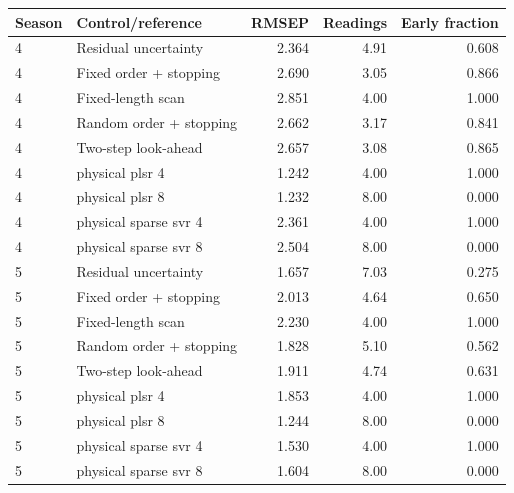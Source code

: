 \begin{tabular}{llrrr}
\toprule
Season & Control/reference & RMSEP & Readings & Early fraction \\
\midrule
4 & Residual uncertainty & 2.364 & 4.91 & 0.608 \\
4 & Fixed order + stopping & 2.690 & 3.05 & 0.866 \\
4 & Fixed-length scan & 2.851 & 4.00 & 1.000 \\
4 & Random order + stopping & 2.662 & 3.17 & 0.841 \\
4 & Two-step look-ahead & 2.657 & 3.08 & 0.865 \\
4 & physical plsr 4 & 1.242 & 4.00 & 1.000 \\
4 & physical plsr 8 & 1.232 & 8.00 & 0.000 \\
4 & physical sparse svr 4 & 2.361 & 4.00 & 1.000 \\
4 & physical sparse svr 8 & 2.504 & 8.00 & 0.000 \\
5 & Residual uncertainty & 1.657 & 7.03 & 0.275 \\
5 & Fixed order + stopping & 2.013 & 4.64 & 0.650 \\
5 & Fixed-length scan & 2.230 & 4.00 & 1.000 \\
5 & Random order + stopping & 1.828 & 5.10 & 0.562 \\
5 & Two-step look-ahead & 1.911 & 4.74 & 0.631 \\
5 & physical plsr 4 & 1.853 & 4.00 & 1.000 \\
5 & physical plsr 8 & 1.244 & 8.00 & 0.000 \\
5 & physical sparse svr 4 & 1.530 & 4.00 & 1.000 \\
5 & physical sparse svr 8 & 1.604 & 8.00 & 0.000 \\
\bottomrule
\end{tabular}